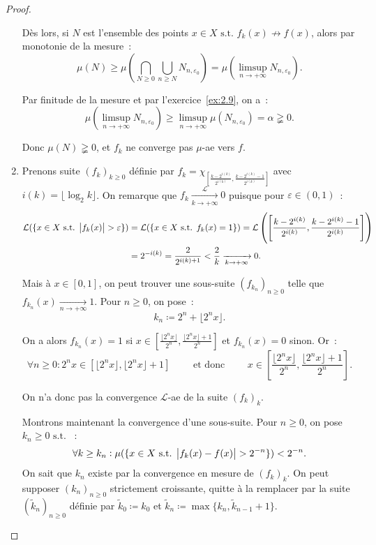 \documentclass{article}
\theoremstyle{definition}
\newcommand{\pinfty}{{+\infty}}
\newcommand{\st}{\text{ s.t. }}
\begin{document}
\begin{proof}
\begin{enumerate}
	Dès lors, si $N$ est l'ensemble des points $x \in X \st f_k(x) \not \to f(x)$, alors par monotonie de la mesure~:
	\[\mu(N) \geq \mu\left(\bigcap_{N \geq 0}\bigcup_{n \geq N}N_{n,\varepsilon_0}\right) = \mu\left(\limsup_{n \to \pinfty}N_{n,\varepsilon_0}\right).\]

	Par finitude de la mesure et par l'exercice~\ref{ex:2.9}, on a~:
	\[\mu\left(\limsup_{n \to \pinfty}N_{n,\varepsilon_0}\right) \geq \limsup_{n \to \pinfty}\mu(N_{n,\varepsilon_0}) = \alpha \gneqq 0.\]

	Donc $\mu(N) \gneqq 0$, et $f_k$ ne converge pas $\mu$-ae vers $f$.

	\item Prenons suite $(f_k)_{k \geq 0}$ définie par $f_k = \chi_{\left[\frac {k-2^{i(k)}}{2^{i(k)}}, \frac {k-2^{i(k)}-1}{2^{i(k)}}\right]}$ avec $i(k) = \lfloor\log_2k\rfloor$.
	On remarque que $f_k \xrightarrow[k \to \pinfty]{\mathcal L} 0$ puisque pour $\varepsilon \in (0, 1)$~:
	\begin{align*}
		\mathcal L(\{x \in X \st \abs {f_k(x)} > \varepsilon\}) &= \mathcal L(\{x \in X \st f_k(x) = 1\})
			= \mathcal L\left(\left[\frac {k-2^{i(k)}}{2^{i(k)}}, \frac {k-2^{i(k)}-1}{2^{i(k)}}\right]\right) \\
		&= 2^{-i(k)} = \frac 2{2^{i(k)+1}} < \frac 2k \xrightarrow[k \to \pinfty]{} 0.
	\end{align*}

	Mais à $x \in [0, 1]$, on peut trouver une sous-suite $(f_{k_n})_{n \geq 0}$ telle que $f_{k_n}(x) \xrightarrow[n \to \pinfty]{} 1$. Pour $n \geq 0$, on pose~:
	\[k_n \coloneqq 2^n + \lfloor2^nx\rfloor.\]

	On a alors $f_{k_n}(x) = 1$ si $x \in \left[\frac {\lfloor2^nx\rfloor}{2^n}, \frac {\lfloor2^nx\rfloor+1}{2^n}\right]$ et $f_{k_n}(x) = 0$ sinon. Or~:
	\[\forall n \geq 0 : 2^nx \in \left[\lfloor2^nx\rfloor, \lfloor2^nx\rfloor+1\right]
	\qquad\text{ et donc }\qquad x \in \left[\frac {\lfloor2^nx\rfloor}{2^n}, \frac {\lfloor2^nx\rfloor+1}{2^n}\right].\]

	On n'a donc pas la convergence $\mathcal L$-ae de la suite $(f_k)_k$.

	Montrons maintenant la convergence d'une sous-suite. Pour $n \geq 0$, on pose $k_n \geq 0 \st$~:
	\[\forall k \geq k_n : \mu(\{x \in X \st \abs {f_k(x)-f(x)} > 2^{-n}\}) < 2^{-n}.\]
	On sait que $k_n$ existe par la convergence en mesure de $(f_k)_k$. On peut supposer $(k_n)_{n \geq 0}$ strictement croissante, quitte à la remplacer par la suite
	$(\tilde k_n)_{n \geq 0}$ définie par $\tilde k_0 \coloneqq k_0$ et $\tilde k_n \coloneqq \max\{k_n, \tilde k_{n-1}+1\}$.


\end{enumerate}
\end{proof}
\end{document}
